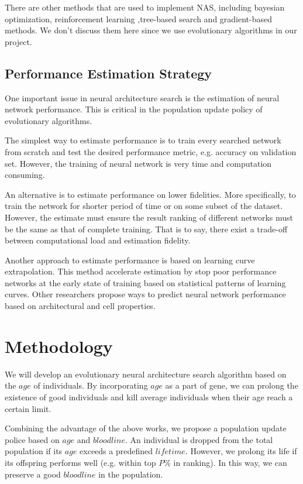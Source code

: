 \documentclass{article}
\begin{document}
\begin{normalsize}
    There are other methods that are used to implement NAS, including bayesian optimization, reinforcement learning ,tree-based search and gradient-based methods. We don't discuss them here since we use evolutionary algorithms in our project.

    \subsection{Performance Estimation Strategy}
    One important issue in neural architecture search is the estimation of neural network performance. This is critical in the population update policy of evolutionary algorithms. 

    The simplest way to estimate performance is to train every searched network from scratch and test the desired performance metric, e.g. accuracy on validation set. However, the training of neural network is very time and computation consuming. 
    
    An alternative is to estimate performance on lower fidelities. More specifically, to train the network for shorter period of time\cite{zoph2018learning} or on some subset of the dataset\cite{klein2016fast}. However, the estimate must ensure the result ranking of different networks must be the same as that of complete training. That is to say, there exist a trade-off between computational load and estimation fidelity.

    Another approach to estimate performance is based on learning curve extrapolation\cite{domhan2015speeding}. This method accelerate estimation by stop poor performance networks at the early state of training based on statistical patterns of learning curves. Other researchers propose ways to predict neural network performance based on architectural and cell properties\cite{liu2018progressive}. 

    \section{Methodology}

    We will develop an evolutionary neural architecture search algorithm based on the $age$ of individuals. By incorporating $age$ as a part of gene, we can prolong the existence of good individuals\cite{DBLP:journals/corr/abs-1802-01548} and kill average individuals when their age reach a certain limit\cite{Hornby:2006:AAP:1143997.1144142}. 

    Combining the advantage of the above works, we propose a population update police based on $age$ and $bloodline$. An individual is dropped from the total population if its $age$ exceeds a predefined $lifetime$. However, we prolong its life if its offspring performs well (e.g. within top $P\%$ in ranking). In this way, we can preserve a good $bloodline$ in the population.


\end{normalsize}
\end{document}
